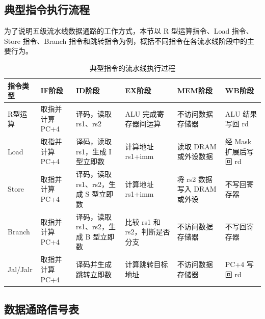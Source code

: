 \documentclass[12pt,a4paper]{ctexart}
\begin{document}
\subsection{典型指令执行流程}

为了说明五级流水线数据通路的工作方式，本节以 R 型运算指令、Load 指令、Store 指令、Branch 指令和跳转指令为例，概括不同指令在各流水线阶段中的主要行为。

\begin{table}[H]
	\centering
	\caption{典型指令的流水线执行过程}
	\footnotesize
	\setlength{\tabcolsep}{3pt}
	\renewcommand{\arraystretch}{1.2}
	\begin{tabularx}{\textwidth}{p{2cm}p{2.2cm}p{2.4cm}p{2.4cm}p{2.4cm}X}
		\toprule
		指令类型     & IF阶段       & ID阶段                    & EX阶段                & MEM阶段               & WB阶段            \\
		\midrule
		R型运算     & 取指并计算 PC+4 & 译码，读取 rs1、rs2           & ALU 完成寄存器间运算        & 不访问数据存储器            & ALU 结果写回 rd     \\
		Load     & 取指并计算 PC+4 & 译码，读取 rs1，生成 I 型立即数     & 计算地址 rs1+imm        & 读取 DRAM 或外设数据       & 经 Mask 扩展后写回 rd \\
		Store    & 取指并计算 PC+4 & 译码，读取 rs1、rs2，生成 S 型立即数 & 计算地址 rs1+imm        & 将 rs2 数据写入 DRAM 或外设 & 不写回寄存器          \\
		Branch   & 取指并计算 PC+4 & 译码，读取 rs1、rs2，生成 B 型立即数 & 比较 rs1 和 rs2，判断是否分支 & 不访问数据存储器            & 不写回寄存器          \\
		Jal/Jalr & 取指并计算 PC+4 & 译码并生成跳转立即数              & 计算跳转目标地址            & 不访问数据存储器            & PC+4 写回 rd      \\
		\bottomrule
	\end{tabularx}
\end{table}

\subsection{数据通路信号表}
\end{document}
